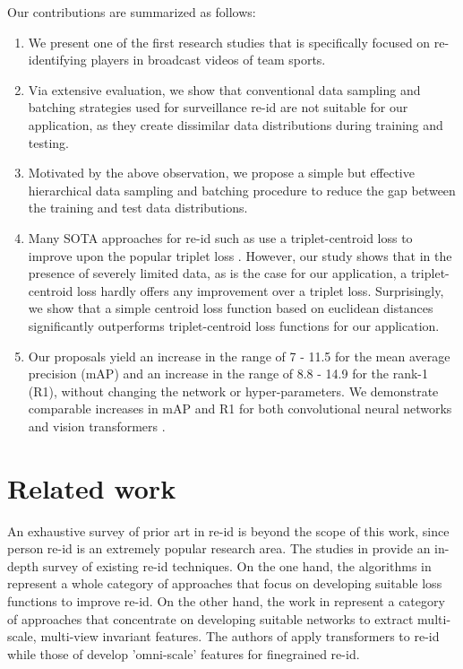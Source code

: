 \documentclass{article}
\begin{document}
Our contributions are summarized as follows:
\begin{enumerate}
    \item We present one of the first research studies that is specifically focused on re-identifying players in broadcast videos of team sports.
    \item Via extensive evaluation, we show that conventional data sampling and batching strategies used for surveillance re-id are not suitable for our application, as they create dissimilar data distributions during training and testing.
    \item Motivated by the above observation, we propose a simple but effective hierarchical data sampling and batching procedure to reduce the gap between the training and test data distributions. 
    \item Many SOTA approaches for re-id such as \cite{wieczorek2021unreasonable, do2019theoretically, yuan2020defense, zhang2020beyond, wang2019centroid, lagunes2020centroids, alnissany2022modified} use a triplet-centroid loss to improve upon the popular triplet loss \cite{hermans2017defense}. However, our study shows that in the presence of severely limited data, as is the case for our application, a triplet-centroid loss hardly offers any improvement over a triplet loss. Surprisingly, we show that a simple centroid loss function based on euclidean distances significantly outperforms triplet-centroid loss functions for our application.
\item Our proposals yield an increase in the range of 7 - 11.5 for the mean average precision (mAP) and an increase in the range of 8.8 - 14.9 for the rank-1 (R1), without changing the network or hyper-parameters. We demonstrate comparable increases in mAP and R1 for both convolutional neural networks and vision transformers \cite{dosovitskiy2020image, touvron2021training}.
\end{enumerate}


\section{Related work}
\label{sec:related_work}

An exhaustive survey of prior art in re-id is beyond the scope of this work, since person re-id is an extremely popular research area. The studies in \cite{wu2019deep, wang2019beyond, radhliterature} provide an in-depth survey of existing re-id techniques. On the one hand, the algorithms in \cite{yuan2020defense, do2019theoretically, yuan2020defense, zhang2020beyond, wang2019centroid, lagunes2020centroids, wieczorek2021unreasonable, alnissany2022modified} represent a whole category of approaches that focus on developing suitable loss functions to improve re-id. On the other hand, the work in \cite{he2021transreid, zhou2019omni, zhou2021learning} represent a category of approaches that concentrate on developing suitable networks to extract multi-scale, multi-view invariant features. The authors of \cite{he2021transreid} apply transformers to re-id while those of \cite{zhou2019omni, zhou2021learning} develop 'omni-scale' features for finegrained re-id.
\end{document}
